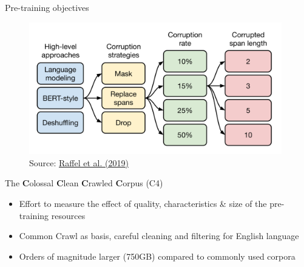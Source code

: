 
\begin{frame}{Pre-training objectives}

\vfill

	\begin{figure}
		\centering
		\includegraphics[width = 11cm]{figure/t5-objectives2.png}\\ 
		\footnotesize{Source:} \href{https://arxiv.org/pdf/1910.10683.pdf}{\footnotesize Raffel et al. (2019)}
	\end{figure}
	
\vfill

\end{frame}


\begin{frame}{The \textbf{C}olossal \textbf{C}lean \textbf{C}rawled \textbf{C}orpus (C4)}

\vfill

	\begin{itemize}
		\item Effort to measure the effect of quality, characteristics \& size of the pre-training resources
		\item Common Crawl as basis, careful cleaning and filtering for English language
		\item Orders of magnitude larger (750GB) compared to commonly used corpora 
	\end{itemize}
	
\vfill

\end{frame}


